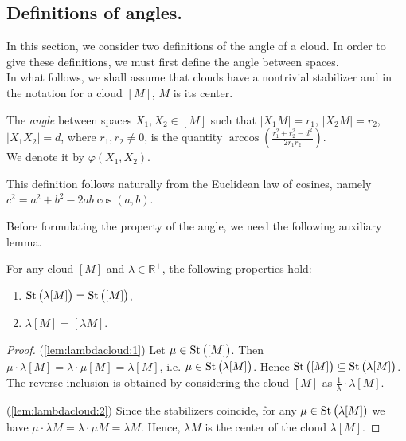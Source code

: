 \subsection{Definitions of angles.}
In this section, we consider two definitions of the angle of a cloud.
In order to
give these definitions, we must first define the angle between spaces.
\\
In what follows, we shall assume that clouds have a nontrivial stabilizer and in
the notation for a cloud \( [M] \), \( M \) is its center.
\begin{definition}
  The \emph{angle} between spaces \( X_1, X_2 \in [M] \) such that \( |X_1
  M| = r_1 \), \( | X_2 M | =r_2 \), \( |X_1 X_2| = d\), where \( r_1,
  r_2 \neq 0 \), is the quantity \( \arccos \left(\frac{r_1^2 +
  r_{2}^2 - d^2}{2r_1r_2} \right)\).\\ We denote it by \(
  \varphi(X_1, X_2) \).
\end{definition}
\begin{remark}
  This definition follows naturally from the Euclidean law of cosines,
  namely \( c^{2} = a^2 + b^2 - 2ab\cos (a,b) \).
\end{remark}
Before formulating the property of the angle, we need the following auxiliary
lemma.
\begin{lemma}
  \label{lem:lambdacloud} For any cloud \( [M] \) and \( \lambda
  \in\mathbb{R}^+ \), the following properties hold:
  \begin{enumerate}
    \item \( \operatorname{St}\big(\lambda [M]\big) = \operatorname{St}\big([M]\big) \),
      \label{lem:lambdacloud:1}
    \item \( \lambda [M] = [\lambda M] \).\label{lem:lambdacloud:2}
  \end{enumerate}
\end{lemma}
\begin{proof}
  (\ref{lem:lambdacloud:1}) Let \( \mu \in \operatorname{St}\big([M]\big) \). Then \( \mu
  \cdot \lambda [M] = \lambda \cdot \mu [M]= \lambda [M] \), i.e. \( \mu \in
  \operatorname{St}\big(\lambda [M]\big) \). Hence \( \operatorname{St}\big([M]\big) \subseteq
  \operatorname{St}\big(\lambda [M]\big) \). The reverse inclusion is obtained by
  considering
  the cloud \( [M] \) as \(\frac{1}{\lambda}\cdot \lambda [M] \).

  (\ref{lem:lambdacloud:2}) Since the stabilizers coincide, for any
  \( \mu \in  \operatorname{St}\big(\lambda [M])\) we have \( \mu \cdot \lambda M =
  \lambda \cdot \mu M = \lambda M \). Hence, \( \lambda M \) is the center
  of the cloud \( \lambda [M] \).
\end{proof}
